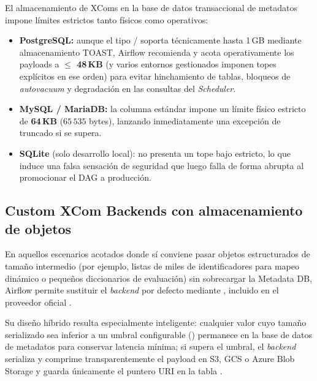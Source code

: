 El almacenamiento de XComs en la base de datos transaccional de metadatos impone límites estrictos tanto físicos como operativos:
\begin{itemize}
  \item \textbf{PostgreSQL:} aunque el tipo / soporta técnicamente hasta 1\,GB mediante almacenamiento TOAST, Airflow recomienda y acota operativamente los payloads a \textbf{$\le$ 48\,KB} (y varios entornos gestionados imponen topes explícitos en ese orden) para evitar hinchamiento de tablas, bloqueos de \textit{autovacuum} y degradación en las consultas del \textit{Scheduler}.
  \item \textbf{MySQL / MariaDB:} la columna  estándar impone un límite físico estricto de \textbf{64\,KB} ($65\,535$ bytes), lanzando inmediatamente una excepción de truncado si se supera.
  \item \textbf{SQLite} (solo desarrollo local): no presenta un tope bajo estricto, lo que induce una falsa sensación de seguridad que luego falla de forma abrupta al promocionar el DAG a producción.
\end{itemize}

\subsection{Custom XCom Backends con almacenamiento de objetos}

En aquellos escenarios acotados donde sí conviene pasar objetos estructurados de tamaño intermedio (por ejemplo, listas de miles de identificadores para mapeo dinámico o pequeños diccionarios de evaluación) sin sobrecargar la Metadata DB, Airflow permite sustituir el \textit{backend} por defecto mediante , incluido en el proveedor oficial .

Su diseño híbrido resulta especialmente inteligente: cualquier valor cuyo tamaño serializado sea inferior a un umbral configurable () permanece en la base de datos de metadatos para conservar latencia mínima; si supera el umbral, el \textit{backend} serializa y comprime transparentemente el payload en S3, GCS o Azure Blob Storage y guarda únicamente el puntero URI en la tabla .

